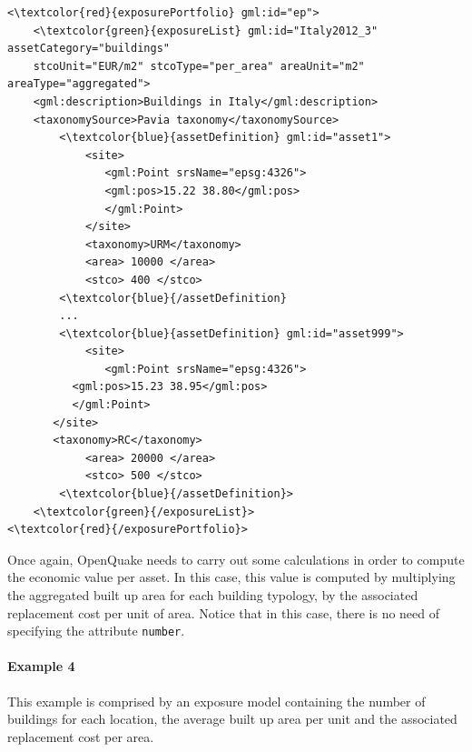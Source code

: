 \begin{Verbatim}[frame=single, commandchars=\\\{\}, samepage=false]
<\textcolor{red}{exposurePortfolio} gml:id="ep">
    <\textcolor{green}{exposureList} gml:id="Italy2012_3" assetCategory="buildings" 
    stcoUnit="EUR/m2" stcoType="per_area" areaUnit="m2" areaType="aggregated">
    <gml:description>Buildings in Italy</gml:description>
    <taxonomySource>Pavia taxonomy</taxonomySource>
        <\textcolor{blue}{assetDefinition} gml:id="asset1">
            <site>
               <gml:Point srsName="epsg:4326">
               <gml:pos>15.22 38.80</gml:pos>
               </gml:Point>
            </site>
            <taxonomy>URM</taxonomy>
            <area> 10000 </area>
            <stco> 400 </stco>
        <\textcolor{blue}{/assetDefinition} 
        ...
        <\textcolor{blue}{assetDefinition} gml:id="asset999">
            <site>
               <gml:Point srsName="epsg:4326">
	      <gml:pos>15.23 38.95</gml:pos>
	      </gml:Point>
	   </site>
	   <taxonomy>RC</taxonomy>
            <area> 20000 </area>
            <stco> 500 </stco>
        <\textcolor{blue}{/assetDefinition}> 
    <\textcolor{green}{/exposureList}>
<\textcolor{red}{/exposurePortfolio}>
\end{Verbatim}

Once again, OpenQuake needs to carry out some calculations in order to compute the economic value per asset. In this case, this value is computed by multiplying the aggregated built up area for each building typology, by the associated replacement cost per unit of area. Notice that in this case, there is no need of specifying the attribute \Verb+number+.

 \paragraph{Example 4}
This example is comprised by an exposure model containing the number of buildings for each location, the average built up area per unit and the associated replacement cost per area.

